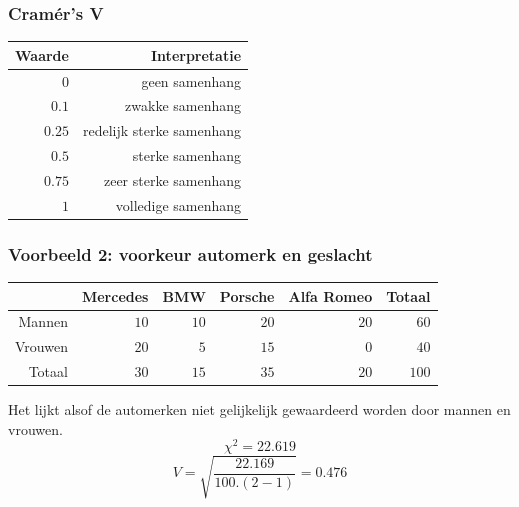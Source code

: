 \documentclass[aspectratio=169]{beamer}
\begin{document}
\begin{frame}
  \frametitle{Cramér's V}
  
  
  \begin{table}[h] \centering
    \begin{tabular}{@{}rr@{}} \toprule
      Waarde & Interpretatie \\
      \midrule
      $0$ & geen samenhang \\
      $0.1$ &  zwakke samenhang \\
      $0.25$ & redelijk sterke samenhang \\
      $0.5$ & sterke samenhang \\
      $0.75$ & zeer sterke samenhang \\
      $1$ & volledige samenhang \\
      \bottomrule
    \end{tabular}
  \end{table}
\end{frame}

\begin{frame}
  \frametitle{Voorbeeld 2: voorkeur automerk en geslacht}
  \begin{table}[h] \centering
    \begin{tabular}{@{}rrrrrr@{}} \toprule
      & Mercedes & BMW & Porsche& Alfa Romeo & Totaal \\
      \midrule
      Mannen  & $10$ & $10$ & $20$ & $20$ & $60$ \\
      Vrouwen & $20$ & $5$  & $15$ & $0$  & $40$ \\
      Totaal  & $30$ & $15$ & $35$ & $20$ & $100$ \\
      \bottomrule
    \end{tabular}
  \end{table}
  Het lijkt alsof de automerken niet gelijkelijk gewaardeerd worden door mannen en vrouwen.
  \[ \chi^{2} = 22.619 \]
  \[ V = \sqrt{\frac{22.169}{100 . (2-1)}}  = 0.476\]
\end{frame}
\end{document}
